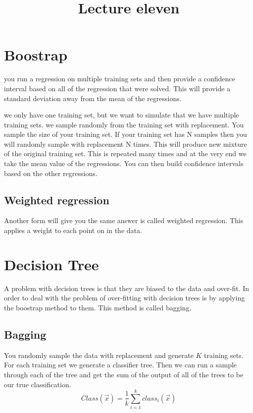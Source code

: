 \documentclass[letterpaper, 9pt]{article}
\title{Lecture eleven}
\begin{document}
\maketitle
\section{Boostrap}
you run a regression on multiple training sets and then provide a confidence interval based on all of the regression that were solved. This will provide a standard deviation away from the mean of the regressions.

we only have one training set, but we want to simulate that we have multiple training sets. we sample randomly from the training set with replacement. You sample the size of your training set. If your training set has N samples then you will randomly sample with replacement N times. This will produce new mixture of the original training set. This is repeated many times and at the very end we take the mean value of the regressions. You can then build confidence intervals based on the other regressions.

\subsection{Weighted regression}
Another form will give you the same answer is called weighted regression. This applies a weight to each point on in the data.

\section{Decision Tree}
A problem with decision trees is that they are biased to the data and over-fit. In order to deal with the problem of over-fitting with decision trees is by applying the boostrap method to them. This method is called bagging.

\subsection{Bagging}
You randomly sample the data with replacement and generate $K$ training sets. For each training set we generate a classifier tree. Then we can run a sample through each of the tree and get the sum of the output of all of the trees to be our true classification.
\begin{equation}
Class(\vec{x}) = \frac{1}{k}\sum_{i=1}^k class_i(\vec{x})
\end{equation}
\end{document}
